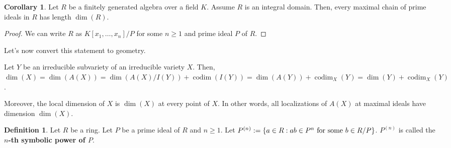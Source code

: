 \documentclass{article}
\theoremstyle{definition}
\newtheorem{definition}{Definition}
\newtheorem{corollary}{Corollary}[theorem]
\newcommand{\codim}{\operatorname{codim}}
\begin{document}
\begin{corollary}
    Let $ R $ be a finitely generated algebra over a field $ K $.
    Assume $ R $ is an integral domain.
    Then, every maximal chain of prime ideals in $ R $ has length $ \dim(R) $.
\end{corollary}
\begin{proof}
    We can write $ R $ as $ K[x_{1}, \ldots, x_{n}] / P $ for some $ n \geq 1 $
    and prime ideal $ P $ of $ R $.   %
\end{proof}

Let's now convert this statement to geometry.

Let $ Y $ be an irreducible subvariety of an irreducible variety $ X $.
Then, $ \dim(X) = \dim(A(X)) = \dim(A(X)/I(Y)) + \codim(I(Y)) = \dim(A(Y)) + \codim_{X}(Y) = \dim(Y) + \codim_{X}(Y)$.

Moreover, the local dimension of $ X $ is $ \dim(X) $ at every point of $ X $. In other words,
all localizations of $ A(X) $ at maximal ideals have dimension $ \dim(X) $.

\begin{definition}
    Let $ R $ be a ring. Let $ P $ be a prime ideal of $ R $ and $ n \geq 1 $.
    Let $ P^{(n)} := \{ a \in R : ab \in P^{n} \text{ for some $ b \in R/P $} \} $.
    $ P^{(n)} $ is called the \textbf{$ n $-th symbolic power of $ P $}.
\end{definition}
\end{document}
